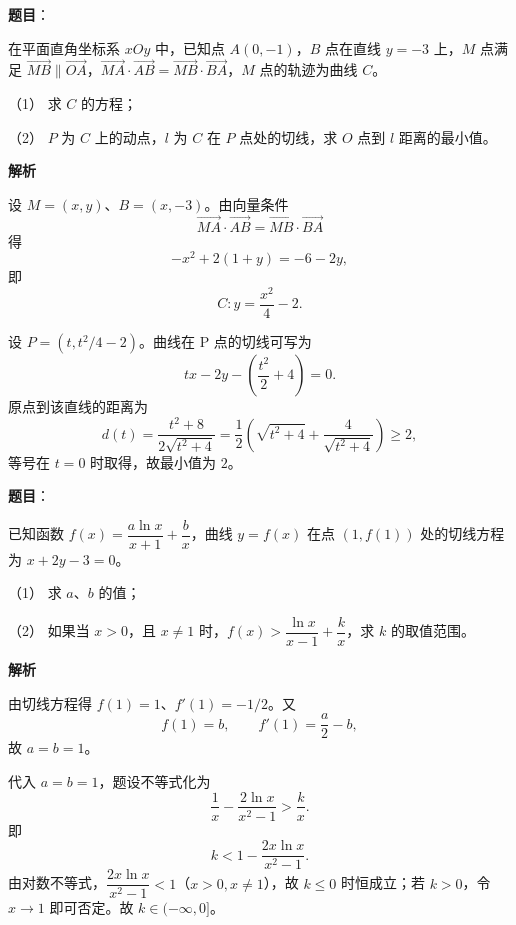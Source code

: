 \begin{answer}

\textbf{题目}：

在平面直角坐标系 $xOy$ 中，已知点 $A(0,-1)$，$B$ 点在直线 $y=-3$ 上，$M$ 点满足 $\overrightarrow{MB}\parallel\overrightarrow{OA}$，$\overrightarrow{MA}\cdot\overrightarrow{AB}=\overrightarrow{MB}\cdot\overrightarrow{BA}$，$M$ 点的轨迹为曲线 $C$。

（1） 求 $C$ 的方程；

（2） $P$ 为 $C$ 上的动点，$l$ 为 $C$ 在 $P$ 点处的切线，求 $O$ 点到 $l$ 距离的最小值。

\textbf{解析}


设 $M=(x,y)$、$B=(x,-3)$。由向量条件
\nopagebreak[4]
\[
\overrightarrow{MA}\cdot\overrightarrow{AB}
=\overrightarrow{MB}\cdot\overrightarrow{BA}
\]
得
\nopagebreak[4]
\[
-x^2+2(1+y)=-6-2y,
\]
即
\nopagebreak[4]
\[
C:y=\frac{x^2}{4}-2.
\]


设 $P=(t,t^2/4-2)$。曲线在 P 点的切线可写为
\nopagebreak[4]
\[
t x-2y-\left(\frac{t^2}{2}+4\right)=0.
\]
原点到该直线的距离为
\nopagebreak[4]
\[
d(t)=\frac{t^2+8}{2\sqrt{t^2+4}}
=\frac12\left(\sqrt{t^2+4}+\frac4{\sqrt{t^2+4}}\right)\geq2,
\]
等号在 $t=0$ 时取得，故最小值为 $2$。



\end{answer}
\begin{answer}

\textbf{题目}：

已知函数 $f(x)=\dfrac{a\ln x}{x+1}+\dfrac bx$，曲线 $y=f(x)$ 在点 $(1,f(1))$ 处的切线方程为 $x+2y-3=0$。

（1） 求 $a\text{、}b$ 的值；

（2） 如果当 $x>0$，且 $x\neq1$ 时，$f(x)>\dfrac{\ln x}{x-1}+\dfrac kx$，求 $k$ 的取值范围。

\textbf{解析}


由切线方程得 $f(1)=1$、$f'(1)=-1/2$。又
\nopagebreak[4]
\[
f(1)=b,\qquad f'(1)=\frac a2-b,
\]
故 $a=b=1$。


代入 $a=b=1$，题设不等式化为
\nopagebreak[4]
\[
\frac{1}{x}-\frac{2\ln x}{x^2-1}>\frac{k}{x}.
\]
即
\nopagebreak[4]
\[
k<1-\frac{2x\ln x}{x^2-1}.
\]
由对数不等式，$\dfrac{2x\ln x}{x^2-1}<1$（$x>0,x\ne1$），故 $k\leq0$ 时恒成立；若 $k>0$，令 $x\to1$ 即可否定。故 $k\in(-\infty,0]$。


\gkanswer{答案（2）：$k\in(-\infty,0]$。}

\end{answer}
